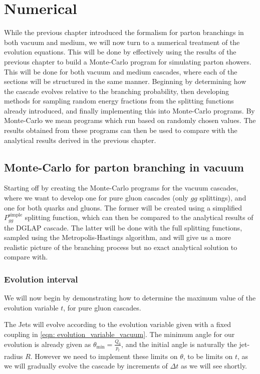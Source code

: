 \documentclass[main.tex]{subfiles}
\begin{document}
\chapter{Numerical}
While the previous chapter introduced the formalism for parton branchings in both vacuum and medium, we will now turn to a numerical treatment of the evolution equations. This will be done by effectively using the results of the previous chapter to build a Monte-Carlo program for simulating parton showers. This will be done for both vacuum and medium cascades, where each of the sections will be structured in the same manner. Beginning by determining how the cascade evolves relative to the branching probability, then developing methods for sampling random energy fractions from the splitting functions already introduced, and finally implementing this into Monte-Carlo programs. By Monte-Carlo we mean programs which run based on randomly chosen values.  The results obtained from these programs can then be used to compare with the analytical results derived in the previous chapter.

\section{Monte-Carlo for parton branching in vacuum}
Starting off by creating the Monte-Carlo programs for the vacuum cascades, where we want to develop one for pure gluon cascades (only \(gg\) splittings), and one for both quarks and gluons. The former will be created using a simplified \(P_{gg}^{\text{simple}}\) splitting function, which can then be compared to the analytical results of the DGLAP cascade. The latter will be done with the full splitting functions, sampled using the Metropolis-Hastings algorithm, and will give us a more realistic picture of the branching process but no exact analytical solution to compare with.

\subsection{Evolution interval }\label{sec: determining_evolution_time_from_sudakov}
We will now begin by demonstrating how to determine the maximum value of the evolution variable \(t\), for pure gluon cascades.

The Jets will evolve according to the evolution variable given with a fixed coupling in \autoref{eqn: evolution_variable_vacuum}. The minimum angle for our evolution is already given as \(\theta_{\text{min}} = \frac{Q_0}{p_t}\), and the initial angle is naturally the jet-radius \(R\). However we need to implement these limits on \(\theta\), to be limits on \(t\), as we will gradually evolve the cascade by increments of \(\Delta t\) as we will see shortly. 
\end{document}
